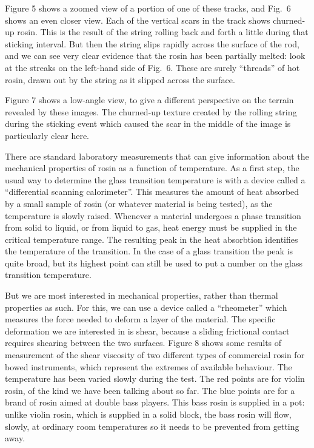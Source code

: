   Figure 5 shows a zoomed view of a portion of one of these tracks, and Fig.\ 6 
  shows an even closer view. Each of the vertical scars in the track shows 
  churned-up rosin. This is the result of the string rolling back and forth a 
  little during that sticking interval. But then the string slips rapidly 
  across the surface of the rod, and we can see very clear evidence that the 
  rosin has been partially melted: look at the streaks on the left-hand side of 
  Fig.\ 6. These are surely ``threads'' of hot rosin, drawn out by the string 
  as it slipped across the surface. 

  Figure 7 shows a low-angle view, to give a different perspective on the 
  terrain revealed by these images. The churned-up texture created by the 
  rolling string during the sticking event which caused the scar in the middle 
  of the image is particularly clear here. 

  There are standard laboratory measurements that can give information about 
  the mechanical properties of rosin as a function of temperature. As a first 
  step, the usual way to determine the glass transition temperature is with a 
  device called a “differential scanning calorimeter”. This measures the amount 
  of heat absorbed by a small sample of rosin (or whatever material is being 
  tested), as the temperature is slowly raised. Whenever a material undergoes a 
  phase transition from solid to liquid, or from liquid to gas, heat energy 
  must be supplied in the critical temperature range. The resulting peak in the 
  heat absorbtion identifies the temperature of the transition. In the case of 
  a glass transition the peak is quite broad, but its highest point can still 
  be used to put a number on the glass transition temperature. 

  But we are most interested in mechanical properties, rather than thermal 
  properties as such. For this, we can use a device called a “rheometer” which 
  measures the force needed to deform a layer of the material. The specific 
  deformation we are interested in is shear, because a sliding frictional 
  contact requires shearing between the two surfaces. Figure 8 shows some 
  results of measurement of the shear viscosity of two different types of 
  commercial rosin for bowed instruments, which represent the extremes of 
  available behaviour. The temperature has been varied slowly during the test. 
  The red points are for violin rosin, of the kind we have been talking about 
  so far. The blue points are for a brand of rosin aimed at double bass 
  players. This bass rosin is supplied in a pot: unlike violin rosin, which is 
  supplied in a solid block, the bass rosin will flow, slowly, at ordinary room 
  temperatures so it needs to be prevented from getting away. 

